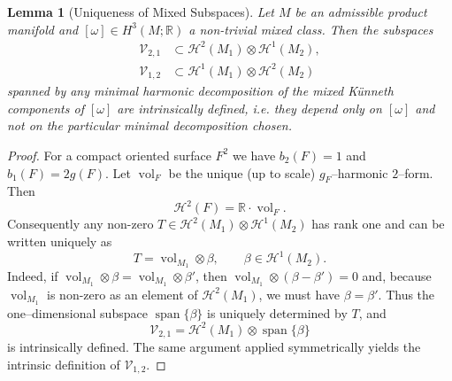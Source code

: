 \documentclass[11pt,reqno]{amsart}
\theoremstyle{plain}
\newtheorem{lemma}[theorem]{Lemma}
\theoremstyle{definition}
\numberwithin{equation}{section}
\begin{document}
\begin{lemma}[Uniqueness of Mixed Subspaces]\label{lem:invariance}
Let $M$ be an admissible product manifold and $[\omega]\in H^3(M;\mathbb{R})$
a non-trivial mixed class.  Then the subspaces
\begin{align}\label{eq:V-spaces}
\mathcal{V}_{2,1}&\subset\mathcal{H}^2(M_1)\otimes\mathcal{H}^1(M_2),\\
\mathcal{V}_{1,2}&\subset\mathcal{H}^1(M_1)\otimes\mathcal{H}^2(M_2)
\end{align}
spanned by any minimal harmonic decomposition of the mixed K\"unneth components of $[\omega]$ are \emph{intrinsically defined}, i.e. they depend only on $[\omega]$ and not on the particular minimal decomposition chosen.
\end{lemma}

\begin{proof}

For a compact oriented surface $F^2$ we have
$b_2(F)=1$ and $b_1(F)=2g(F)$.  Let $\operatorname{vol}_{F}$ be the unique
(up to scale) $g_F$--harmonic $2$--form.  Then
\[
\mathcal{H}^2(F)=\mathbb{R}\cdot\operatorname{vol}_{F}.
\]
Consequently any non-zero $T\in\mathcal{H}^2(M_1)\otimes\mathcal{H}^1(M_2)$
has rank one and can be written uniquely as
\[
T=\operatorname{vol}_{M_1}\otimes\beta,
\qquad \beta\in\mathcal{H}^1(M_2).
\]
Indeed, if $\operatorname{vol}_{M_1}\otimes\beta
=\operatorname{vol}_{M_1}\otimes\beta'$, then
$\operatorname{vol}_{M_1}\otimes(\beta-\beta')=0$ and, because
$\operatorname{vol}_{M_1}$ is non-zero as an element of $\mathcal{H}^2(M_1)$,
we must have $\beta=\beta'$.  Thus the one--dimensional subspace
$\operatorname{span}\{\beta\}$ is uniquely determined by $T$, and
\[
\mathcal{V}_{2,1}= \mathcal{H}^2(M_1)\otimes\operatorname{span}\{\beta\}
\]
is intrinsically defined.  The same argument applied symmetrically yields
the intrinsic definition of $\mathcal{V}_{1,2}$.
\end{proof}
\end{document}
